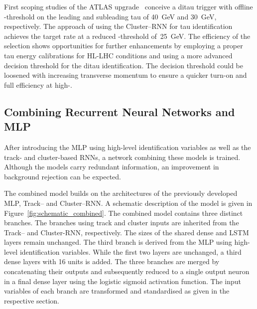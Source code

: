 First scoping studies of the ATLAS upgrade~\cite{phase_2_scoping} conceive a
ditau trigger with offline \tauhadvis \pt-threshold on the leading and
subleading tau of \SI{40}{\GeV} and \SI{30}{\GeV}, respectively. The approach of
using the Cluster--RNN for tau identification achieves the target rate at a
reduced \tauhadvis \pt-threshold of~\SI{25}{\GeV}. The efficiency of the
selection shows opportunities for further enhancements by employing a proper tau
energy calibrations for HL-LHC conditions and using a more advanced decision
threshold for the ditau identification. The decision threshold could be
loosened with increasing transverse momentum to ensure a quicker turn-on and
full efficiency at high-\pt.

\subsection{Combining Recurrent Neural Networks and MLP}
\label{sec:rnn_combined}
After introducing the MLP using high-level identification variables as well as
the track- and cluster-based RNNs, a network combining these models is trained.
Although the models carry redundant information, an improvement in background
rejection can be expected.

The combined model builds on the architectures of the previously developed MLP,
Track-- and Cluster--RNN. A schematic description of the model is given in
Figure~\ref{fig:schematic_combined}. The combined model contains three distinct
branches. The branches using track and cluster inputs are inherited from the
Track-- and Cluster-RNN, respectively. The sizes of the shared dense and LSTM
layers remain unchanged. The third branch is derived from the MLP using
high-level identification variables. While the first two layers are unchanged, a
third dense layers with 16 units is added. The three branches are merged by
concatenating their outputs and subsequently reduced to a single output neuron
in a final dense layer using the logistic sigmoid activation function. The input
variables of each branch are transformed and standardised as given in the
respective section.

